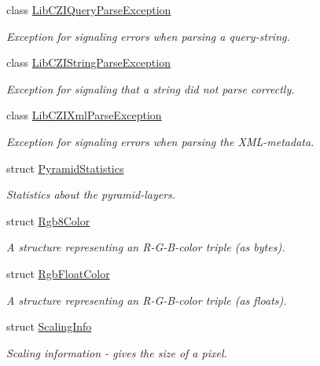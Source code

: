 \begin{DoxyCompactItemize}
class \hyperlink{classlib_c_z_i_1_1_lib_c_z_i_query_parse_exception}{Lib\+C\+Z\+I\+Query\+Parse\+Exception}
\begin{DoxyCompactList}\small\item\em Exception for signaling errors when parsing a query-\/string. \end{DoxyCompactList}\item 
class \hyperlink{classlib_c_z_i_1_1_lib_c_z_i_string_parse_exception}{Lib\+C\+Z\+I\+String\+Parse\+Exception}
\begin{DoxyCompactList}\small\item\em Exception for signaling that a string did not parse correctly. \end{DoxyCompactList}\item 
class \hyperlink{classlib_c_z_i_1_1_lib_c_z_i_xml_parse_exception}{Lib\+C\+Z\+I\+Xml\+Parse\+Exception}
\begin{DoxyCompactList}\small\item\em Exception for signaling errors when parsing the X\+M\+L-\/metadata. \end{DoxyCompactList}\item 
struct \hyperlink{structlib_c_z_i_1_1_pyramid_statistics}{Pyramid\+Statistics}
\begin{DoxyCompactList}\small\item\em Statistics about the pyramid-\/layers. \end{DoxyCompactList}\item 
struct \hyperlink{structlib_c_z_i_1_1_rgb8_color}{Rgb8\+Color}
\begin{DoxyCompactList}\small\item\em A structure representing an R-\/\+G-\/\+B-\/color triple (as bytes). \end{DoxyCompactList}\item 
struct \hyperlink{structlib_c_z_i_1_1_rgb_float_color}{Rgb\+Float\+Color}
\begin{DoxyCompactList}\small\item\em A structure representing an R-\/\+G-\/\+B-\/color triple (as floats). \end{DoxyCompactList}\item 
struct \hyperlink{structlib_c_z_i_1_1_scaling_info}{Scaling\+Info}
\begin{DoxyCompactList}\small\item\em Scaling information -\/ gives the size of a pixel. \end{DoxyCompactList}\item 

\end{DoxyCompactItemize}
